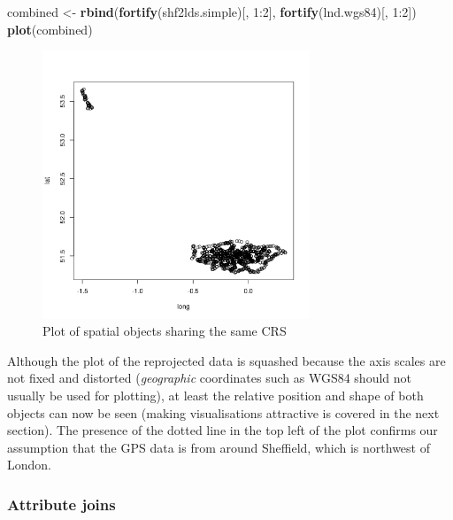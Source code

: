 \documentclass[]{article}
\newenvironment{Shaded}{}{}
\newcommand{\KeywordTok}[1]{\textcolor[rgb]{0.00,0.44,0.13}{\textbf{{#1}}}}
\newcommand{\DecValTok}[1]{\textcolor[rgb]{0.25,0.63,0.44}{{#1}}}
\newcommand{\NormalTok}[1]{{#1}}
\let\Oldincludegraphics\includegraphics
\renewcommand{\includegraphics}[1]{\Oldincludegraphics[width=8cm]{#1}}
\begin{document}
\begin{Shaded}
\begin{Highlighting}[]
\NormalTok{combined <- }\KeywordTok{rbind}\NormalTok{(}\KeywordTok{fortify}\NormalTok{(shf2lds.simple)[, }\DecValTok{1}\NormalTok{:}\DecValTok{2}\NormalTok{], }\KeywordTok{fortify}\NormalTok{(lnd.wgs84)[, }\DecValTok{1}\NormalTok{:}\DecValTok{2}\NormalTok{])}
\KeywordTok{plot}\NormalTok{(combined)}
\end{Highlighting}
\end{Shaded}
\begin{figure}[htbp]
\centering
\includegraphics{figure/Plot_of_spatial_objects_sharing_the_same_CRS.png}
\caption{Plot of spatial objects sharing the same CRS}
\end{figure}

Although the plot of the reprojected data is squashed because the axis
scales are not fixed and distorted (\emph{geographic} coordinates such
as WGS84 should not usually be used for plotting), at least the relative
position and shape of both objects can now be seen (making
visualisations attractive is covered in the next section). The presence
of the dotted line in the top left of the plot confirms our assumption
that the GPS data is from around Sheffield, which is northwest of
London.

\subsubsection{Attribute joins}
\end{document}
